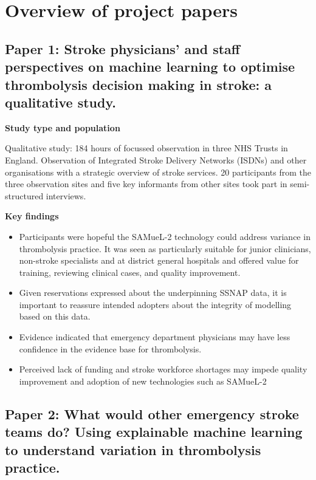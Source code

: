 \section{Overview of project papers}
\label{sec:papers}

\subsection{Paper 1: Stroke physicians' and staff perspectives on machine learning to optimise thrombolysis decision making in stroke: a qualitative study. \cite{jarvie_stroke_2024}}

\textbf{Study type and population}

Qualitative study: 184 hours of focussed observation in three NHS Trusts in England. Observation of Integrated Stroke Delivery Networks (ISDNs) and other organisations with a strategic overview of stroke services. 20 participants from the three observation sites and five key informants from other sites took part in semi-structured interviews.

\textbf{Key findings}

\begin{itemize}
    \item Participants were hopeful the SAMueL-2 technology could address variance in thrombolysis practice. It was seen as particularly suitable for junior clinicians, non-stroke specialists and at district general hospitals and offered value for training, reviewing clinical cases, and quality improvement.

    \item Given reservations expressed about the underpinning SSNAP data, it is important to reassure intended adopters about the integrity of modelling based on this data.

    \item Evidence indicated that emergency department physicians may have less confidence in the evidence base for thrombolysis.

    \item Perceived lack of funding and stroke workforce shortages may impede quality improvement and adoption of new technologies such as SAMueL-2

\end{itemize}


\subsection{Paper 2: What would other emergency stroke teams do? Using explainable machine learning to understand variation in thrombolysis practice.\cite{pearn_what_2023}}

